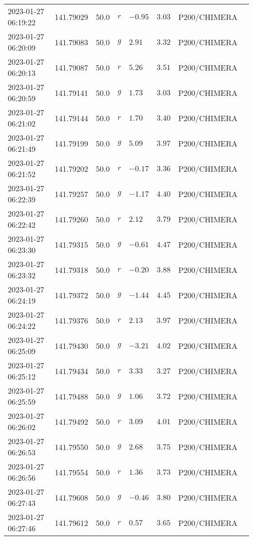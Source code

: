 \documentclass{nature_plusfigure}
\begin{document}
\begin{supplement}
\begin{center}
\begin{longtable}{llllllll}
2023-01-27 06:19:22 & 141.79029 & 50.0 & $r$ & $-0.95$ & $3.03$ & P200/CHIMERA &  \\ 
2023-01-27 06:20:09 & 141.79083 & 50.0 & $g$ & $2.91$ & $3.32$ & P200/CHIMERA &  \\ 
2023-01-27 06:20:13 & 141.79087 & 50.0 & $r$ & $5.26$ & $3.51$ & P200/CHIMERA &  \\ 
2023-01-27 06:20:59 & 141.79141 & 50.0 & $g$ & $1.73$ & $3.03$ & P200/CHIMERA &  \\ 
2023-01-27 06:21:02 & 141.79144 & 50.0 & $r$ & $1.70$ & $3.40$ & P200/CHIMERA &  \\ 
2023-01-27 06:21:49 & 141.79199 & 50.0 & $g$ & $5.09$ & $3.97$ & P200/CHIMERA &  \\ 
2023-01-27 06:21:52 & 141.79202 & 50.0 & $r$ & $-0.17$ & $3.36$ & P200/CHIMERA &  \\ 
2023-01-27 06:22:39 & 141.79257 & 50.0 & $g$ & $-1.17$ & $4.40$ & P200/CHIMERA &  \\ 
2023-01-27 06:22:42 & 141.79260 & 50.0 & $r$ & $2.12$ & $3.79$ & P200/CHIMERA &  \\ 
2023-01-27 06:23:30 & 141.79315 & 50.0 & $g$ & $-0.61$ & $4.47$ & P200/CHIMERA &  \\ 
2023-01-27 06:23:32 & 141.79318 & 50.0 & $r$ & $-0.20$ & $3.88$ & P200/CHIMERA &  \\ 
2023-01-27 06:24:19 & 141.79372 & 50.0 & $g$ & $-1.44$ & $4.45$ & P200/CHIMERA &  \\ 
2023-01-27 06:24:22 & 141.79376 & 50.0 & $r$ & $2.13$ & $3.97$ & P200/CHIMERA &  \\ 
2023-01-27 06:25:09 & 141.79430 & 50.0 & $g$ & $-3.21$ & $4.02$ & P200/CHIMERA &  \\ 
2023-01-27 06:25:12 & 141.79434 & 50.0 & $r$ & $3.33$ & $3.27$ & P200/CHIMERA &  \\ 
2023-01-27 06:25:59 & 141.79488 & 50.0 & $g$ & $1.06$ & $3.72$ & P200/CHIMERA &  \\ 
2023-01-27 06:26:02 & 141.79492 & 50.0 & $r$ & $3.09$ & $4.01$ & P200/CHIMERA &  \\ 
2023-01-27 06:26:53 & 141.79550 & 50.0 & $g$ & $2.68$ & $3.75$ & P200/CHIMERA &  \\ 
2023-01-27 06:26:56 & 141.79554 & 50.0 & $r$ & $1.36$ & $3.73$ & P200/CHIMERA &  \\ 
2023-01-27 06:27:43 & 141.79608 & 50.0 & $g$ & $-0.46$ & $3.80$ & P200/CHIMERA &  \\ 
2023-01-27 06:27:46 & 141.79612 & 50.0 & $r$ & $0.57$ & $3.65$ & P200/CHIMERA &  \\ 

\end{longtable}
\end{center}
\end{supplement}
\end{document}
